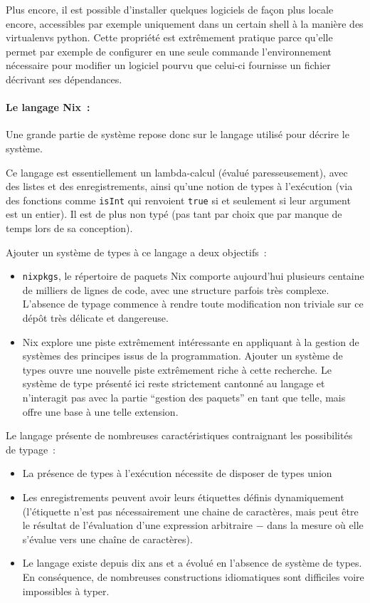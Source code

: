 \begin{description}
    Plus encore, il est possible d'installer quelques logiciels de façon plus
    locale encore, accessibles par exemple uniquement dans un certain shell à
    la manière des virtualenvs python. Cette propriété est extrêmement pratique
    parce qu'elle permet par exemple de configurer en une seule commande
    l'environnement nécessaire pour modifier un logiciel pourvu que celui-ci
    fournisse un fichier décrivant ses dépendances.
\end{description}

\paragraph{Le langage Nix :}

Une grande partie de système repose donc sur le langage utilisé pour décrire le
système.

Ce langage est essentiellement un lambda-calcul (évalué paresseusement), avec
des listes et des enregistrements, ainsi qu'une notion de types à l'exécution
(via des fonctions comme \lstinline{isInt} qui renvoient \lstinline{true} si et
seulement si leur argument est un entier).
Il est de plus non typé (pas tant par choix que par manque de temps lors de sa
conception).

Ajouter un système de types à ce langage a deux objectifs :

\begin{itemize}
  \item \texttt{nixpkgs}, le répertoire de paquets Nix comporte aujourd'hui
    plusieurs centaine de milliers de lignes de code, avec une structure
    parfois très complexe.
    L'absence de typage commence à rendre toute modification non triviale sur
    ce dépôt très délicate et dangereuse.
  \item Nix explore une piste extrêmement intéressante en appliquant à la
    gestion de systèmes des principes issus de la programmation. Ajouter un
    système de types ouvre une nouvelle piste extrêmement riche à cette
    recherche. Le système de type présenté ici reste strictement cantonné au
    langage et n'interagit pas avec la partie ``gestion des paquets'' en tant que
    telle, mais offre une base à une telle extension.
\end{itemize}

Le langage présente de nombreuses caractéristiques contraignant les
possibilités de typage :

\begin{itemize}
  \item La présence de types à l'exécution nécessite de disposer de types union
  \item Les enregistrements peuvent avoir leurs étiquettes définis
    dynamiquement (l'étiquette n'est pas nécessairement une chaine de
    caractères, mais peut être le résultat de l'évaluation d'une expression
    arbitraire − dans la mesure où elle s'évalue vers une chaîne de
    caractères).
  \item Le langage existe depuis dix ans et a évolué en l'absence de système de
    types. En conséquence, de nombreuses constructions idiomatiques sont
    difficiles voire impossibles à typer.
\end{itemize}
